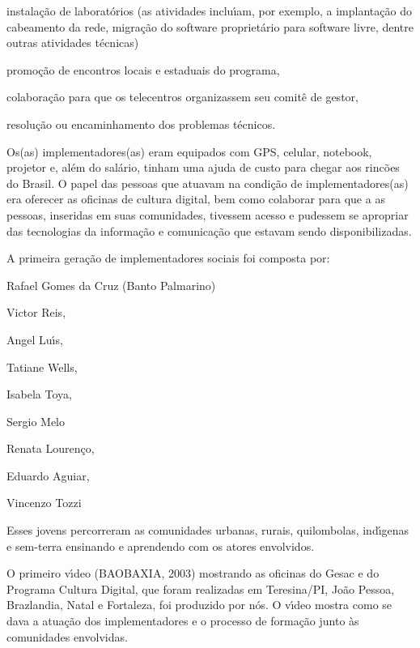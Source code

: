 \documentclass[
12pt,		%
openright,	%
twoside,  %
a4paper,			%
chapter=TITLE,		%
english,			%
french,				%
spanish,			%
brazil				%
]{USPSC-classe/USPSC}
\begin{document}
\begin{alineas}
\item instala\c{c}\~ao de laborat\'orios (as atividades inclu\'{\i}am, por exemplo, a implanta\c{c}\~ao do cabeamento da rede, migra\c{c}\~ao do software propriet\'ario para software livre, dentre outras atividades t\'ecnicas)
\item promo\c{c}\~ao de encontros locais e estaduais do programa,
\item colabora\c{c}\~ao para que os telecentros organizassem seu  comit\^e de gestor,
\item resolu\c{c}\~ao ou encaminhamento dos problemas  t\'ecnicos.
\end{alineas}

Os(as) implementadores(as) eram equipados com GPS, celular, notebook, projetor  e, al\'em do sal\'ario, tinham uma ajuda de custo para chegar aos rinc\~oes do Brasil. O papel das pessoas que atuavam na condi\c{c}\~ao de implementadores(as) era oferecer as oficinas de cultura digital, bem como colaborar para que a as pessoas, inseridas em suas comunidades, tivessem acesso e pudessem se apropriar das tecnologias da informa\c{c}\~ao e comunica\c{c}\~ao que estavam sendo disponibilizadas.




A  primeira gera\c{c}\~ao de implementadores  sociais foi composta por:





\begin{alineas}
\item Rafael Gomes da Cruz (Banto Palmarino)
\item Victor Reis,
\item Angel Lu\'{\i}s,
\item Tatiane Wells,
\item Isabela Toya,
\item Sergio Melo
\item Renata Louren\c{c}o,
\item Eduardo Aguiar,
\item Vincenzo Tozzi
\end{alineas}

Esses jovens percorreram as comunidades urbanas, rurais, quilombolas, ind\'{\i}genas e sem-terra ensinando e aprendendo com os atores envolvidos.




O primeiro v\'{\i}deo  (BAOBAXIA, 2003)  mostrando as oficinas do Gesac e do Programa Cultura Digital, que foram realizadas em Teresina/PI, Jo\~ao Pessoa, Brazlandia, Natal e Fortaleza, foi produzido por n\'os. O v\'{\i}deo mostra como se dava a atua\c{c}\~ao dos implementadores e o processo de forma\c{c}\~ao junto \`as comunidades envolvidas.
\end{document}
